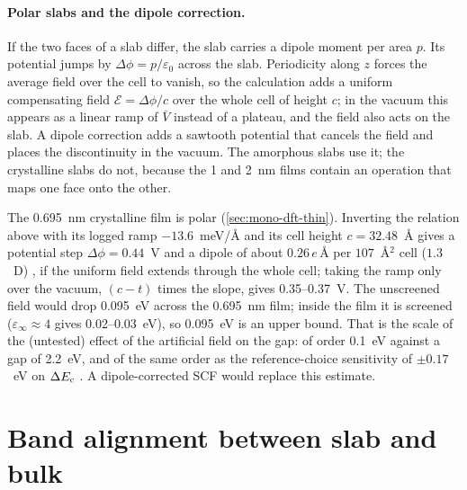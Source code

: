 \paragraph{Polar slabs and the dipole correction.} If the two faces of a slab differ, the slab carries a dipole moment
per area $p$. Its potential jumps by $\Delta\phi = p/\varepsilon_0$ across the slab. Periodicity along $z$ forces the
average field over the cell to vanish, so the calculation adds a uniform compensating field $\mathcal{E} =
\Delta\phi/c$ over the whole cell of height $c$; in the vacuum this appears as a linear ramp of $\bar V$ instead of a
plateau, and the field also acts on the slab. A dipole correction \citep{Neugebauer1992,Bengtsson1999} adds a sawtooth
potential that cancels the field and places the discontinuity in the vacuum. The amorphous slabs use it; the
crystalline slabs do not, because the 1 and 2~nm films contain an operation that maps one face onto the other.

The 0.695~nm crystalline film is polar (\cref{sec:mono-dft-thin}). Inverting the relation above with its logged ramp
$-13.6$~meV/\AA{} and its cell height $c = 32.48$~\AA{} gives a potential step $\Delta\phi = 0.44$~V and a dipole of
about $0.26\,e$\,\AA{} per $107$~\AA$^2$ cell ($1.3$~D) , if the uniform field extends through the whole cell;
taking the ramp only over the vacuum, $(c-t)$ times the slope, gives 0.35--0.37~V. The unscreened field would drop
0.095~eV across the 0.695~nm film; inside the film it is screened ($\varepsilon_\infty \approx 4$ gives 0.02--0.03~eV),
so 0.095~eV is an upper bound. That is the scale of the (untested) effect of the artificial field on the gap: of order 0.1~eV
against a gap of 2.2~eV, and of the same order as the reference-choice sensitivity of $\pm0.17$~eV on $\Delta E_{\mathrm{c}}$
. A dipole-corrected SCF would replace this estimate.

\section{Band alignment between slab and bulk}
\label{sec:mono-dft-align}

